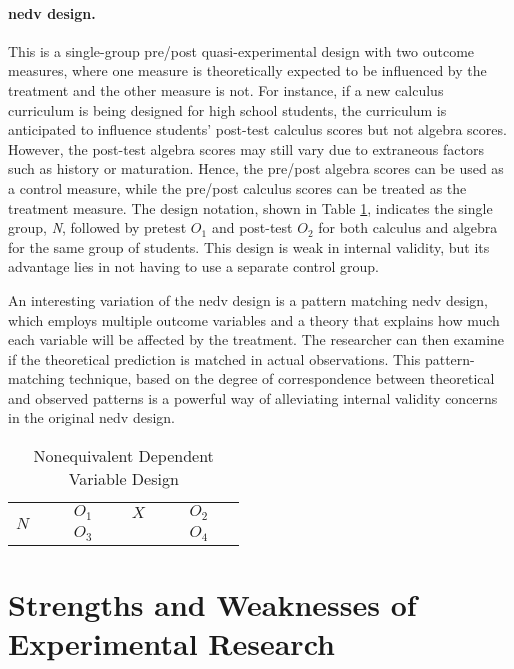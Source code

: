 \paragraph{\gls{nedv} design.} This is a single-group pre/post quasi-experimental design with two outcome measures, where one measure is theoretically expected to be influenced by the treatment and the other measure is not. For instance, if a new calculus curriculum is being designed for high school students, the curriculum is anticipated to influence students' post-test calculus scores but not algebra scores. However, the post-test algebra scores may still vary due to extraneous factors such as history or maturation. Hence, the pre/post algebra scores can be used as a control measure, while the pre/post calculus scores can be treated as the treatment measure. The design notation, shown in Table \ref{09:tab13}, indicates the single group, \textit{N}, followed by pretest $ O_1 $ and post-test $ O_2 $ for both calculus and algebra for the same group of students. This design is weak in internal validity, but its advantage lies in not having to use a separate control group.

An interesting variation of the \gls{nedv} design is a pattern matching \gls{nedv} design, which employs multiple outcome variables and a theory that explains how much each variable will be affected by the treatment. The researcher can then examine if the theoretical prediction is matched in actual observations. This pattern-matching technique, based on the degree of correspondence between theoretical and observed patterns is a powerful way of alleviating internal validity concerns in the original \gls{nedv} design.

\begin{table}[H]
	\centering
	\begin{tabularx}{0.65\linewidth}{p{0.15\linewidth}p{0.15\linewidth}p{0.15\linewidth}p{0.15\linewidth}}
		\toprule
		\multirow{2}{*}{$ N $} & $ O_1 $ & $ X $ & $ O_2 $ \\
		                       & $ O_3 $ &       & $ O_4 $ \\
		\bottomrule
	\end{tabularx}
	\caption{Nonequivalent Dependent Variable Design}
	\label{09:tab13}
\end{table}

\section{Strengths and Weaknesses of Experimental Research}

